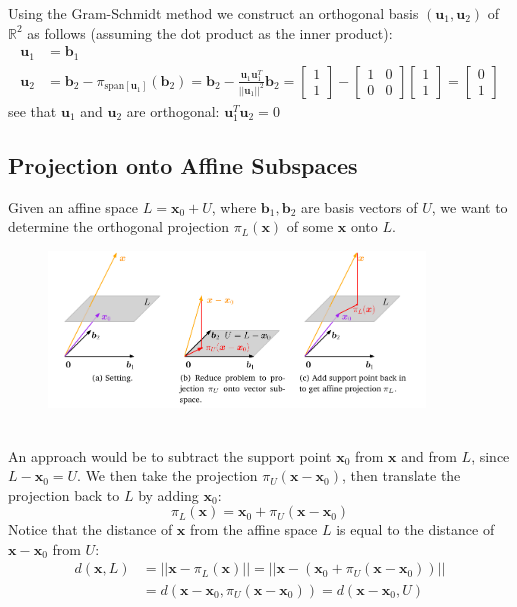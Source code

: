 \documentclass{report}
\begin{document}
Using the Gram-Schmidt method we construct an orthogonal basis $(\bm{u}_1,\bm{u}_2)$ of $\mathbb{R}^2$ as follows
(assuming the dot product as the inner product):
\begin{align*}
\bm{u}_1&=\bm{b}_1\\
\bm{u}_2&=\bm{b}_2-\pi_{\text{span}[\bm{u}_1]}(\bm{b}_2)
=\bm{b}_2-\frac{\bm{u}_1\bm{u}_1^T}{||\bm{u}_1||^2}\bm{b}_2=\begin{bmatrix}1\\1\end{bmatrix}
-\begin{bmatrix}1&0\\0&0\end{bmatrix}
\begin{bmatrix}1\\1\end{bmatrix}
=\begin{bmatrix}0\\1\end{bmatrix}
\end{align*}
see that $\bm{u}_1$ and $\bm{u}_2$ are orthogonal: $\bm{u}_1^T\bm{u}_2=0$
\newpage

\subsection{Projection onto Affine Subspaces} %
Given an affine space $L=\bm{x}_0+U$, where $\bm{b}_1,\bm{b}_2$ are basis vectors of $U$, we want 
to determine the orthogonal projection $\pi_L(\bm{x})$ of some $\bm{x}$ onto $L$.
\begin{figure}[h]
\includegraphics[width=10cm]{11}\\
\centering
\end{figure}\\
An approach would be to subtract the support point $\bm{x}_0$ from $\bm{x}$ and from $L$, since $L-\bm{x}_0=U$.
We then take the projection $\pi_U(\bm{x}-\bm{x}_0)$, then translate the projection back to $L$ 
by adding $\bm{x}_0$:
\begin{equation*}
\pi_L(\bm{x})=\bm{x}_0+\pi_U(\bm{x}-\bm{x}_0)
\end{equation*}
Notice that the distance of $\bm{x}$ from the affine space $L$ is equal to the distance of $\bm{x}-\bm{x}_0$
from $U$:
\begin{align*}
d(\bm{x},L)&=||\bm{x}-\pi_L(\bm{x})||=||\bm{x}-(\bm{x}_0
+\pi_U(\bm{x}-\bm{x}_0))||\\
&=d(\bm{x}-\bm{x}_0,\pi_U(\bm{x}-\bm{x}_0))
=d(\bm{x}-\bm{x}_0,U)
\end{align*}
\newpage
\end{document}
